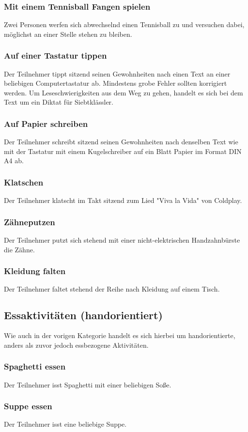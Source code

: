 \subsubsection{Mit einem Tennisball Fangen spielen}
Zwei Personen werfen sich abwechselnd einen Tennisball zu und versuchen dabei, möglichst an einer Stelle stehen zu bleiben.
\subsubsection{Auf einer Tastatur tippen}
Der Teilnehmer tippt sitzend seinen Gewohnheiten nach einen Text an einer beliebigen Computertastatur ab. Mindestens grobe Fehler sollten korrigiert werden. Um Leseschwierigkeiten aus dem Weg zu gehen, handelt es sich bei dem Text um ein Diktat für Siebtklässler.
\subsubsection{Auf Papier schreiben}
Der Teilnehmer schreibt sitzend seinen Gewohnheiten nach denselben Text wie mit der Tastatur mit einem Kugelschreiber auf ein Blatt Papier im Format DIN A4 ab.
\subsubsection{Klatschen}
Der Teilnehmer klatscht im Takt sitzend zum Lied "Viva la Vida" von Coldplay.
\subsubsection{Zähneputzen}
Der Teilnehmer putzt sich stehend mit einer nicht-elektrischen Handzahnbürste die Zähne.
\subsubsection{Kleidung falten}
Der Teilnehmer faltet stehend der Reihe nach Kleidung auf einem Tisch.

\subsection*{Essaktivitäten (handorientiert)}
Wie auch in der vorigen Kategorie handelt es sich hierbei um handorientierte, anders als zuvor jedoch essbezogene Aktivitäten.
\subsubsection{Spaghetti essen}
Der Teilnehmer isst Spaghetti mit einer beliebigen Soße.
\subsubsection{Suppe essen}
Der Teilnehmer isst eine beliebige Suppe.
